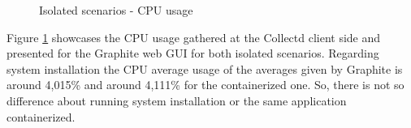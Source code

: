 \begin{figure}[!htb]
  \begin{center}
    \begin{subfigmatrix}{2}
    \end{subfigmatrix}
    \caption{Isolated scenarios - CPU usage}
    \label{F:isoCPU}
  \end{center}
\end{figure}

Figure \ref{F:isoCPU} showcases the CPU usage gathered at the Collectd client side and presented for the Graphite web GUI for both isolated scenarios. Regarding system installation the CPU average usage of the averages given by Graphite is around 4,015\% and around 4,111\% for the containerized one. So, there is not so difference about running system installation or the same application containerized. 

